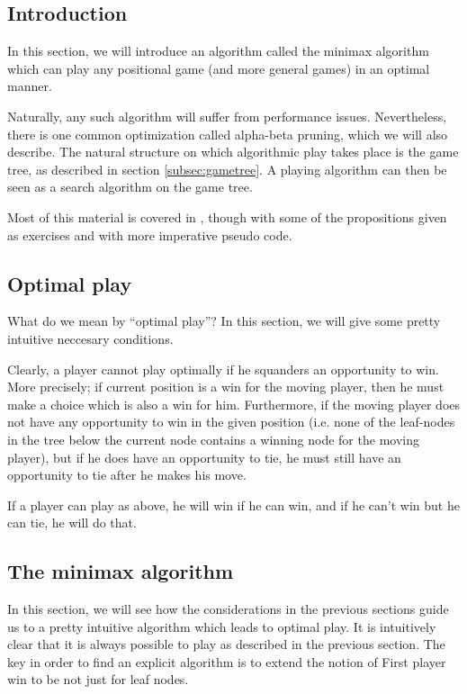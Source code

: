 \subsection{Introduction}

In this section, we will introduce an algorithm called the minimax algorithm which can play any positional game (and more general games) in an optimal manner.

Naturally, any such algorithm will suffer from performance issues.
Nevertheless, there is one common optimization called alpha-beta pruning, which we will also describe.
The natural structure on which algorithmic play takes place is the game tree, as described in section \ref{subsec:gametree}.
A playing algorithm can then be seen as a search algorithm on the game tree.


Most of this material is covered in \citep{aimodernapproach}, though with some of the propositions given as exercises and with more imperative pseudo code.

\subsection{Optimal play}

What do we mean by ``optimal play''?
In this section, we will give some pretty intuitive neccesary conditions.

Clearly, a player cannot play optimally if he squanders an opportunity to win.
More precisely; if current position is a win for the moving player, then he must make a choice which is also a win for him.
Furthermore, if the moving player does not have any opportunity to win in the given position (i.e. none of the leaf-nodes in the tree below the current node contains a winning node for the moving player), but if he does have an opportunity to tie, he must still have an opportunity to tie after he makes his move.

If a player can play as above, he will win if he can win, and if he can't win but he can tie, he will do that.

\subsection{The minimax algorithm}
\label{sec:minimax}

In this section, we will see how the considerations in the previous sections guide us to a pretty intuitive algorithm which leads to optimal play.
It is intuitively clear that it is always possible to play as described in the previous section.
The key in order to find an explicit algorithm is to extend the notion of First player win to be not just for leaf nodes.

